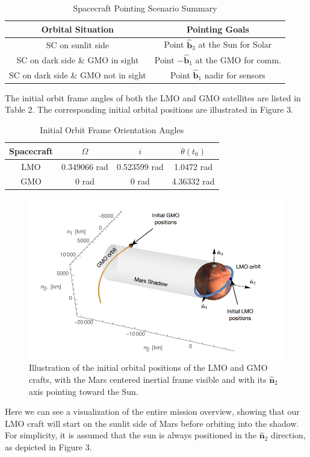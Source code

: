 \documentclass[conf]{new-aiaa}
\begin{document}
\begin{table}[h]
\centering
\caption{Spacecraft Pointing Scenario Summary}
\begin{tabular}{|c|c|}
\hline
\label{table1}
\textbf{Orbital Situation} & \textbf{Pointing Goals} \\ \hline
SC on sunlit side & Point \( \hat{\bm{b}}_3 \) at the Sun for Solar\\ \hline
SC on dark side \& GMO in sight & Point \( -\hat{\bm{b}}_1 \) at the GMO for comm. \\ \hline
SC on dark side \& GMO not in sight & Point \( \hat{\bm{b}}_1 \) nadir for sensors\\ \hline
\end{tabular}
\end{table}

The initial orbit frame angles of both the LMO and GMO satellites are listed in Table 2. The corresponding initial orbital positions are illustrated in Figure 3.

\begin{table}[h]
\centering
\caption{Initial Orbit Frame Orientation Angles}
\begin{tabular}{|c|c|c|c|}
\hline
\textbf{Spacecraft} & \( \Omega \) & \( i \) & \( \theta(t_0) \) \\ \hline
LMO & 0.349066 rad & 0.523599 rad & 1.0472 rad \\ \hline
GMO & 0 rad & 0 rad & 4.36332 rad \\ \hline
\end{tabular}
\end{table}
\begin{figure}[H]
    \centering
    \captionsetup{width=.7\linewidth}
    \includegraphics[width=.75\linewidth]{fig3.PNG}
    \caption{Illustration of the initial orbital positions of the LMO and GMO crafts, with the Mars centered inertial frame visible and with its $\hat{\bm n}_2$ axis pointing toward the Sun.}
    \label{fig:enter-label}
\end{figure}
Here we can see a visualization of the entire mission overview, showing that our LMO craft will start on the sunlit side of Mars before orbiting into the shadow. For simplicity, it is assumed that the sun is always positioned in the \( \hat{\bm{n}}_2 \) direction, as depicted in Figure 3.
\end{document}
